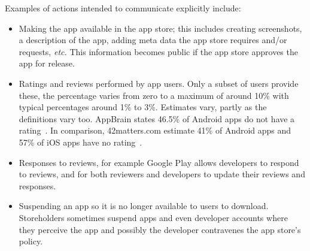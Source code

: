 Examples of actions intended to communicate explicitly include:
\begin{itemize}
    \item Making the app available in the app store; this includes creating screenshots, a description of the app, adding meta data the app store requires and/or requests, \emph{etc.} This information becomes public if the app store approves the app for release.
    \item Ratings and reviews performed by app users. Only a subset of users provide these, the percentage varies from zero to a maximum of around 10\% with typical percentages around 1\% to 3\%. %
    Estimates vary, partly as the definitions vary too. AppBrain states 46.5\% of Android apps do not have a rating~. In comparison, 42matters.com estimate 41\% of Android apps and 57\% of iOS apps have no rating~.
    \item Responses to reviews, for example Google Play allows developers to respond to reviews, and for both reviewers and developers to update their reviews and responses.
    \item Suspending an app so it is no longer available to users to download. Storeholders sometimes suspend apps and even developer accounts where they perceive the app and possibly the developer contravenes the app store's policy. %
    
\end{itemize}
% 


